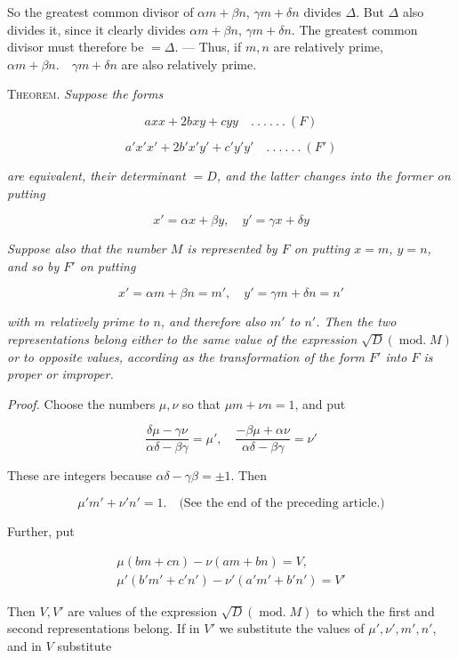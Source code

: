 So the greatest common divisor of $\alpha m+\beta n$, $\gamma m+\delta n$ divides $\Delta$. But $\Delta$ also divides it, since it clearly divides $\alpha m+\beta n$, $\gamma m+\delta n$. The greatest common divisor must therefore be $=\Delta.$ --- Thus, if $m,n$ are relatively prime, $\alpha m+\beta n.\quad\gamma m+\delta n$ are also relatively prime.


\textsc{Theorem.} \emph{Suppose the forms}

\[
axx+2bxy+cyy\quad .\ .\ .\ .\ .\ .\ (F)
\]

\[
a'x'x'+2b'x'y'+c'y'y'\quad .\ .\ .\ .\ .\ .\ (F')
\]

\emph{are equivalent, their determinant $=D$, and the latter changes into the former on putting}

\[
x'=\alpha x+\beta y,\quad y'=\gamma x+\delta y
\]


\emph{Suppose also that the number $M$ is represented by $F$ on putting $x=m$, $y=n$, and so by $F'$ on putting}

\[
x'=\alpha m+\beta n=m',\quad y'=\gamma m+\delta n=n'
\]

\emph{with $m$ relatively prime to $n$, and therefore also $m'$ to $n'$. Then the two representations belong either to the same value of the expression $\surd D(\operatorname{mod.}M)$ or to opposite values, according as the transformation of the form $F'$ into $F$ is proper or improper.}

\emph{Proof.} Choose the numbers $\mu,\nu$ so that $\mu m+\nu n=1$, and put

\[
\frac{\delta\mu-\gamma\nu}{\alpha\delta-\beta\gamma}=\mu',\quad \frac{-\beta\mu+\alpha\nu}{\alpha\delta-\beta\gamma}=\nu'
\]

These are integers because $\alpha\delta-\gamma\beta=\pm1$. Then

\[
\mu'm'+\nu'n'=1.\quad\text{(See the end of the preceding article.)}
\]

Further, put

\[
\begin{gathered}\mu(bm+cn)-\nu(am+bn)=V,\\\mu'(b'm'+c'n')-\nu'(a'm'+b'n')=V'\end{gathered}
\]

Then $V,V'$ are values of the expression $\surd D(\operatorname{mod.}M)$ to which the first and second representations belong. If in $V'$ we substitute the values of $\mu',\nu',m',n'$, and in $V$ substitute

